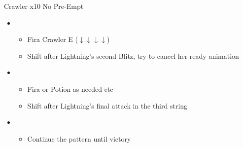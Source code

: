 	\begin{battle}[0:21]{Crawler x10 No Pre-Empt}
		\begin{itemize}
			\item \first
			      \begin{itemize}
				      \item Fira Crawler E ($\downarrow \downarrow \downarrow \downarrow$)
				      \item Shift after Lightning's second Blitz, try to cancel her ready animation
			      \end{itemize}
			\item \sixth
			      \begin{itemize}
				      \item Fira or Potion as needed etc
				      \item Shift after Lightning's final attack in the third string
			      \end{itemize}
			\item \first
			      \begin{itemize}
				      \item Continue the pattern until victory
			      \end{itemize}
		\end{itemize}
	\end{battle}
	\renewcommand{\first}{[1] Slash \& Burn (\com/\rav)}
	\renewcommand{\second}{[2] War \& Peace (\com/\med)}
	\renewcommand{\third}{[3] Supersoldier (\com/\syn)}
	\renewcommand{\fourth}{[4] Dualcasting (\rav/\rav)}
	\renewcommand{\fifth}{[5] Dualcasting (\rav/\rav)}
	\renewcommand{\sixth}{[6] Slash \& Burn (\com/\rav)}
